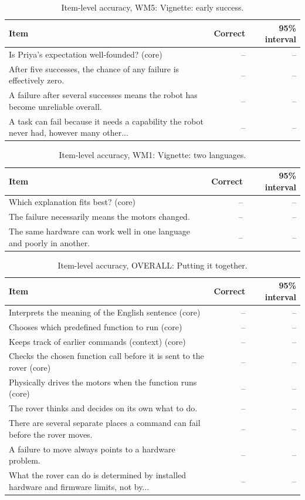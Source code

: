 \begin{table}[t]
\caption{Item-level accuracy, WM5: Vignette: early success.}\label{tab:items-wm5}
\small
\begin{tabular}{p{7.2cm}rr}
\toprule
Item & Correct & 95\% interval\\
\midrule
Is Priya's expectation well-founded? (core) & -- & --\\
After five successes, the chance of any failure is effectively zero. & -- & --\\
A failure after several successes means the robot has become unreliable overall. & -- & --\\
A task can fail because it needs a capability the robot never had, however many other... & -- & --\\
\bottomrule
\end{tabular}
\end{table}

\begin{table}[t]
\caption{Item-level accuracy, WM1: Vignette: two languages.}\label{tab:items-wm1}
\small
\begin{tabular}{p{7.2cm}rr}
\toprule
Item & Correct & 95\% interval\\
\midrule
Which explanation fits best? (core) & -- & --\\
The failure necessarily means the motors changed. & -- & --\\
The same hardware can work well in one language and poorly in another. & -- & --\\
\bottomrule
\end{tabular}
\end{table}

\begin{table}[t]
\caption{Item-level accuracy, OVERALL: Putting it together.}\label{tab:items-arch}
\small
\begin{tabular}{p{7.2cm}rr}
\toprule
Item & Correct & 95\% interval\\
\midrule
Interprets the meaning of the English sentence (core) & -- & --\\
Chooses which predefined function to run (core) & -- & --\\
Keeps track of earlier commands (context) (core) & -- & --\\
Checks the chosen function call before it is sent to the rover (core) & -- & --\\
Physically drives the motors when the function runs (core) & -- & --\\
The rover thinks and decides on its own what to do. & -- & --\\
There are several separate places a command can fail before the rover moves. & -- & --\\
A failure to move always points to a hardware problem. & -- & --\\
What the rover can do is determined by installed hardware and firmware limits, not by... & -- & --\\
\bottomrule
\end{tabular}
\end{table}
